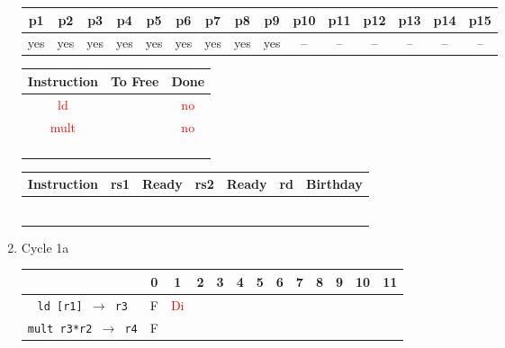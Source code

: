 \documentclass[12pt]{article}
\begin{document}
\begin{enumerate}
\begin{table}[H]
				\begin{tabular}{|c|c|c|c|c|c|c|c|c|c|c|c|c|c|c|}
					\hline
					p1 & p2 & p3 & p4 & p5 & p6 & p7 & p8 & p9 & p10 & p11 & p12 & p13 & p14 & p15\\
					\hline
					yes & yes & yes & yes & yes & yes & yes & yes & yes & -- & -- & -- & -- & -- & --\\
					\hline
				\end{tabular}
			\end{table}
			\begin{table}[H]
				\begin{tabular}{|c|c|c|}
					\hline
					Instruction & To Free & Done\\
					\hline
					\textcolor{red}{ld} & & \textcolor{red}{no}\\
					\hline
					\textcolor{red}{mult} & & \textcolor{red}{no}\\
					\hline
					 & & \\
					\hline
					 & & \\
					\hline
					 & & \\
					\hline
					 & & \\
					\hline
				\end{tabular}
				\hfill
				\begin{tabular}{|c|c|c|c|c|c|c|}
					\hline
					Instruction & rs1 & Ready & rs2 & Ready & rd & Birthday\\
					\hline
					 &  &  &  &  &  & \\
					\hline
					 &  &  &  &  &  & \\
					\hline
					 &  &  &  &  &  & \\
					\hline
					 &  &  &  &  &  & \\
					\hline
					 &  &  &  &  &  & \\
					\hline
					 &  &  &  &  &  & \\
					\hline
				\end{tabular}
			\end{table}
		\item
			Cycle 1a
			\begin{table}[H]
				\begin{tabular}{|c|c|c|c|c|c|c|c|c|c|c|c|c|}
					\hline
					 & 0 & 1 & 2 & 3 & 4 & 5 & 6 & 7 & 8 & 9 & 10 & 11\\
					\hline
					\texttt{ld [r1] $\rightarrow$ r3} & F & \textcolor{red}{Di} &  &  &  &  &  &  &  &  &  &\\
					\hline
					\texttt{mult r3*r2 $\rightarrow$ r4} & F &  &  &  &  &  &  &  &  &  &  &\\

\end{tabular}
\end{table}
\end{enumerate}
\end{document}
